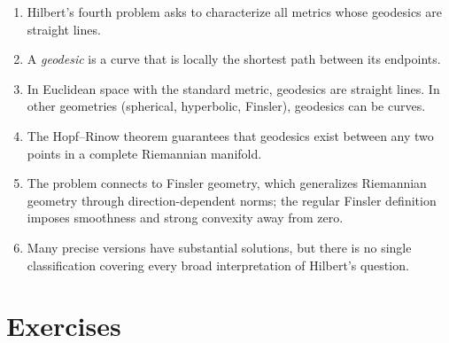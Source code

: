 \begin{enumerate}
    \item Hilbert's fourth problem asks to characterize all metrics whose geodesics are straight lines.
    \item A \emph{geodesic} is a curve that is locally the shortest path between its endpoints.
    \item In Euclidean space with the standard metric, geodesics are straight lines. In other geometries (spherical, hyperbolic, Finsler), geodesics can be curves.
    \item The Hopf--Rinow theorem guarantees that geodesics exist between any two points in a complete Riemannian manifold.
    \item The problem connects to Finsler geometry, which generalizes Riemannian geometry through direction-dependent norms; the regular Finsler definition imposes smoothness and strong convexity away from zero.
    \item Many precise versions have substantial solutions, but there is no single classification covering every broad interpretation of Hilbert's question.
\end{enumerate}

\section{Exercises}

